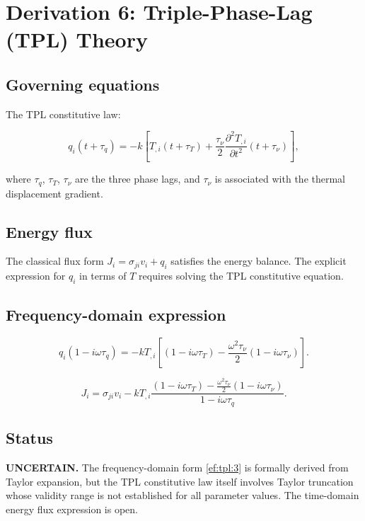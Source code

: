 \section{Derivation 6: Triple-Phase-Lag (TPL) Theory}

\subsection{Governing equations}

The TPL constitutive law:

\begin{equation}
q_i(t + \tau_q) = -k\left[T_{,i}(t + \tau_T) + \frac{\tau_\nu}{2}\frac{\partial^2 T_{,i}}{\partial t^2}(t + \tau_\nu)\right],
\label{ef:tpl:1}
\end{equation}

where $\tau_q$, $\tau_T$, $\tau_\nu$ are the three phase lags, and $\tau_\nu$ is associated with the thermal displacement gradient.

\subsection{Energy flux}

The classical flux form $J_i = \sigma_{ji}v_i + q_i$ satisfies the energy balance. The explicit expression for $q_i$ in terms of $T$ requires solving the TPL constitutive equation.

\subsection{Frequency-domain expression}

\begin{equation}
q_i(1 - i\omega\tau_q) = -k T_{,i}\left[(1 - i\omega\tau_T) - \frac{\omega^2\tau_\nu}{2}(1 - i\omega\tau_\nu)\right].
\label{ef:tpl:2}
\end{equation}

\begin{equation}
J_i = \sigma_{ji}v_i - k T_{,i}\frac{(1 - i\omega\tau_T) - \frac{\omega^2\tau_\nu}{2}(1 - i\omega\tau_\nu)}{1 - i\omega\tau_q}.
\label{ef:tpl:3}
\end{equation}

\subsection{Status}

\textbf{UNCERTAIN.} The frequency-domain form \eqref{ef:tpl:3} is formally derived from Taylor expansion, but the TPL constitutive law itself involves Taylor truncation whose validity range is not established for all parameter values. The time-domain energy flux expression is open.


